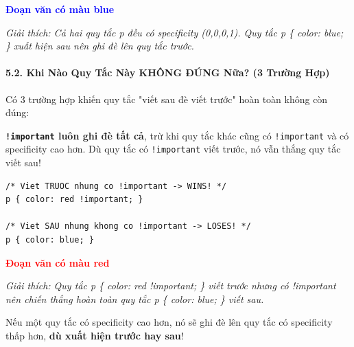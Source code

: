 \documentclass[11pt,oneside]{book}
\newcommand{\codeinline}[1]{\textcolor{accentOrange}{\texttt{#1}}}
\begin{document}
\begin{browserWindow}
\sffamily\small
\textcolor{blue}{\textbf{Đoạn văn có màu blue}} \par\vspace{4pt}
{\scriptsize\textcolor{gray!60}{\textit{Giải thích: Cả hai quy tắc p đều có specificity (0,0,0,1). Quy tắc p \{ color: blue; \} xuất hiện sau nên ghi đè lên quy tắc trước.}}}
\end{browserWindow}

\paragraph{5.2. Khi Nào Quy Tắc Này KHÔNG ĐÚNG Nữa? (3 Trường Hợp)}

Có 3 trường hợp khiến quy tắc "viết sau đè viết trước" hoàn toàn không còn đúng:

\begin{warnBox}
\textbf{\codeinline{!important} luôn ghi đè tất cả}, trừ khi quy tắc khác cũng có \codeinline{!important} và có specificity cao hơn. Dù quy tắc có \codeinline{!important} viết trước, nó vẫn thắng quy tắc viết sau!
\end{warnBox}

\begin{codeWindow}
\begin{lstlisting}[language=CSS3]
/* Viet TRUOC nhung co !important -> WINS! */
p { color: red !important; }

/* Viet SAU nhung khong co !important -> LOSES! */
p { color: blue; }
\end{lstlisting}
\end{codeWindow}

\begin{browserWindow}
\sffamily\small
\textcolor{red}{\textbf{Đoạn văn có màu red}} \par\vspace{4pt}
{\scriptsize\textcolor{gray!60}{\textit{Giải thích: Quy tắc p \{ color: red !important; \} viết trước nhưng có !important nên chiến thắng hoàn toàn quy tắc p \{ color: blue; \} viết sau.}}}
\end{browserWindow}

\begin{warnBox}
Nếu một quy tắc có specificity cao hơn, nó sẽ ghi đè lên quy tắc có specificity thấp hơn, \textbf{dù xuất hiện trước hay sau}!
\end{warnBox}
\end{document}
